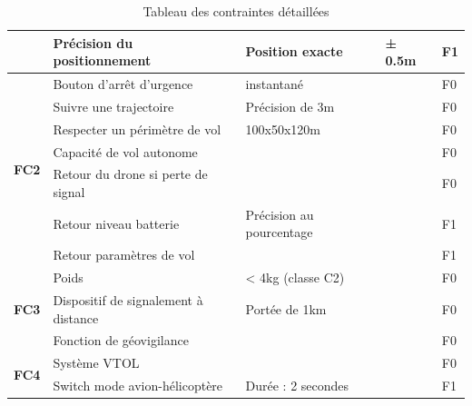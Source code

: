 \documentclass[a4paper,12pt,french]{report}
\begin{document}
\begin{table}[H]
\begin{tabularx}{18.5cm}{|p{2cm}|l|p{4.5cm}|p{2cm}|X|}
                                      & Précision du positionnement          & Position exacte                  & ± 0.5m                        & F1              \\
        \hline
        \multirow{7}{*}{\textbf{FC2}}
                                      & Bouton d'arrêt d’urgence             & instantané                       &                               & F0              \\
                                      & Suivre une trajectoire               & Précision de 3m                  &                               & F0              \\
                                      & Respecter un périmètre de vol        & 100x50x120m                      &                               & F0              \\
                                      & Capacité de vol autonome
                                      &                                      &                                  & F0                                              \\
                                      & Retour du drone si perte de signal   &                                  &                               & F0              \\
                                      & Retour niveau batterie               & Précision au pourcentage         &                               & F1              \\
                                      & Retour paramètres de vol             &                                  &                               & F1              \\
        \hline
        \multirow{3}{*}{\textbf{FC3}}
                                      & Poids                                & < 4kg (classe C2)                &                               & F0              \\
                                      & Dispositif de signalement à distance & Portée de 1km                    &                               & F0              \\
                                      & Fonction de géovigilance             &                                  &                               & F0              \\
        \hline
        \multirow{2}{*}{\textbf{FC4}}
                                      & Système VTOL                         &                                  &                               & F0              \\
                                      & Switch mode avion-hélicoptère        & Durée : 2 secondes               &                               & F1              \\
        \hline
    \end{tabularx}
    \caption{Tableau des contraintes détaillées}
\end{table}
\end{document}
